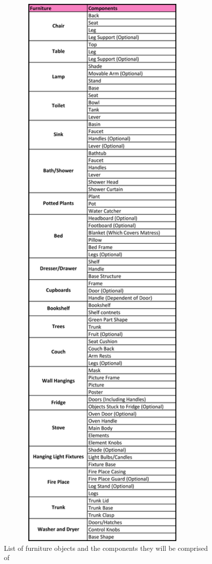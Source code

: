 \begin{figure}[H]
\centering
  \caption{List of furniture objects and the components they will be comprised of}
  \label{fig:furniture_list}
  \includegraphics[width=0.95\textwidth, height=0.5\paperheight, keepaspectratio=true]{images/table_furniture}
  
\end{figure}


